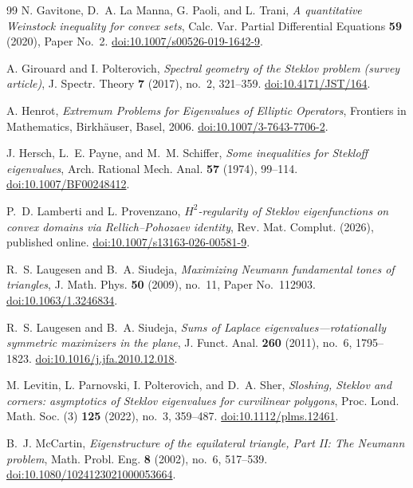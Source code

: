 \documentclass[11pt,reqno]{amsart}
\numberwithin{equation}{section}
\theoremstyle{remark}
\begin{document}
\begin{thebibliography}{99}
N. Gavitone, D.~A. La Manna, G. Paoli, and L. Trani,
\emph{A quantitative Weinstock inequality for convex sets},
Calc. Var. Partial Differential Equations \textbf{59} (2020), Paper No.~2.
\href{https://doi.org/10.1007/s00526-019-1642-9}{doi:10.1007/s00526-019-1642-9}.

A. Girouard and I. Polterovich,
\emph{Spectral geometry of the Steklov problem (survey article)},
J. Spectr. Theory \textbf{7} (2017), no.~2, 321--359.
\href{https://doi.org/10.4171/JST/164}{doi:10.4171/JST/164}.

A. Henrot,
\emph{Extremum Problems for Eigenvalues of Elliptic Operators},
Frontiers in Mathematics, Birkh\"auser, Basel, 2006.
\href{https://doi.org/10.1007/3-7643-7706-2}{doi:10.1007/3-7643-7706-2}.

J. Hersch, L.~E. Payne, and M.~M. Schiffer,
\emph{Some inequalities for Stekloff eigenvalues},
Arch. Rational Mech. Anal. \textbf{57} (1974), 99--114.
\href{https://doi.org/10.1007/BF00248412}{doi:10.1007/BF00248412}.

P.~D. Lamberti and L. Provenzano,
\emph{$H^2$-regularity of Steklov eigenfunctions on convex domains via
Rellich--Pohozaev identity},
Rev. Mat. Complut. (2026), published online.
\href{https://doi.org/10.1007/s13163-026-00581-9}{doi:10.1007/\allowbreak s13163-026-\mbox{00581-9}}.

R.~S. Laugesen and B.~A. Siudeja,
\emph{Maximizing Neumann fundamental tones of triangles},
J. Math. Phys. \textbf{50} (2009), no.~11, Paper No.~112903.
\href{https://doi.org/10.1063/1.3246834}{doi:10.1063/1.3246834}.

R.~S. Laugesen and B.~A. Siudeja,
\emph{Sums of Laplace eigenvalues---rotationally symmetric maximizers in the plane},
J. Funct. Anal. \textbf{260} (2011), no.~6, 1795--1823.
\href{https://doi.org/10.1016/j.jfa.2010.12.018}{doi:10.1016/j.jfa.2010.12.018}.

M. Levitin, L. Parnovski, I. Polterovich, and D.~A. Sher,
\emph{Sloshing, Steklov and corners: asymptotics of Steklov eigenvalues
for curvilinear polygons},
Proc. Lond. Math. Soc. (3) \textbf{125} (2022), no.~3, 359--487.
\href{https://doi.org/10.1112/plms.12461}{doi:10.1112/plms.12461}.

B.~J. McCartin,
\emph{Eigenstructure of the equilateral triangle, Part II: The Neumann problem},
Math. Probl. Eng. \textbf{8} (2002), no.~6, 517--539.
\href{https://doi.org/10.1080/1024123021000053664}{doi:10.1080/1024123021000053664}.


\end{thebibliography}
\end{document}
